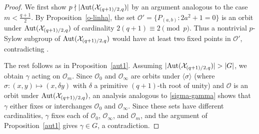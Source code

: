\documentclass[12pt]{amsart}
\theoremstyle{remark}
\theoremstyle{definition}
\def\Aut{{\rm Aut}}
\begin{document}
\begin{proof}
    We first show $p \nmid |\Aut(\mathcal{X}_{(q+1)/2,q})|$ by an argument analogous 
    to the case $m < \frac{q+1}{2}$. By Proposition~\ref{o-linha}, the set 
    $\mathcal{O}' = \{P_{(a,b)} : 2a^2 + 1 = 0\}$ is an orbit under 
    $\Aut(\mathcal{X}_{(q+1)/2,q})$ of cardinality $2(q+1) \equiv 2 \pmod{p}$. Thus a nontrivial
    $p$-Sylow subgroup of $\Aut(\mathcal{X}_{(q+1)/2,q})$ would have at least two fixed 
    points in $\mathcal{O}'$, contradicting 
    \cite[Lemma~11.129]{HKT}.

    The rest follows as in Proposition~\ref{aut1}. Assuming 
    $|\Aut(\mathcal{X}_{(q+1)/2,q})| > |G|$, we obtain $\gamma$ acting on 
    $\mathcal{O}_m$. Since $\mathcal{O}_0$ and $\mathcal{O}_\infty$ are 
    orbits under $\langle \sigma \rangle$ (where 
    $\sigma \colon (x,y) \mapsto (x, \delta y)$ with $\delta$ a primitive 
    $(q+1)$-th root of unity) and $\mathcal{O}$ is an orbit under 
    $\Aut(\mathcal{X}_{(q+1)/2,q})$, an analysis analogous to 
    \eqref{sigma-gamma} shows that $\gamma$ either fixes or interchanges 
    $\mathcal{O}_0$ and $\mathcal{O}_\infty$. Since these sets have 
    different cardinalities, $\gamma$ fixes each of 
    $\mathcal{O}_0$, $\mathcal{O}_\infty$, and $\mathcal{O}_m$, and the 
    argument of Proposition~\ref{aut1} gives $\gamma \in G$, a contradiction.
\end{proof}
\end{document}
